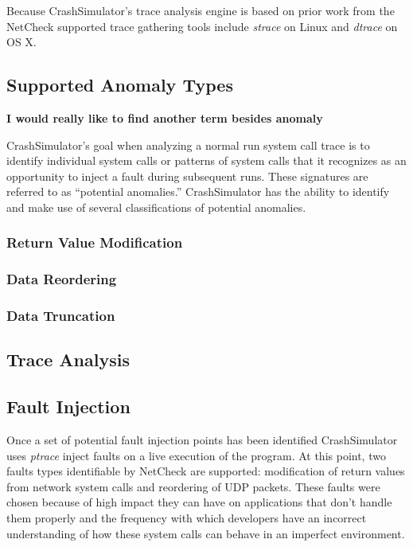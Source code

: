         Because CrashSimulator's trace analysis engine is based on prior work from the NetCheck supported trace
        gathering tools include \emph{strace} on Linux and \emph{dtrace} on OS X.


    \subsection{Supported Anomaly Types}

        \textbf{I would really like to find another term besides anomaly}

        CrashSimulator's goal when analyzing a normal run system call trace is to identify individual system calls or
        patterns of system calls that it recognizes as an opportunity to inject a fault during subsequent runs. These
        signatures are referred to as ``potential anomalies.'' CrashSimulator has the ability to identify and make use
        of several classifications of potential anomalies.

        \subsubsection{Return Value Modification}

        \subsubsection{Data Reordering}

        \subsubsection{Data Truncation}

    \subsection{Trace Analysis}



    \subsection{Fault Injection}



         Once a set of potential fault injection points has been identified CrashSimulator uses \emph{ptrace} inject
         faults on a live execution of the program. At this point, two faults types identifiable by NetCheck are
         supported: modification of return values from network system calls and reordering of UDP packets.  These faults
         were chosen because of high impact they can have on applications that don't handle them properly and the
         frequency with which developers have an incorrect understanding of how these system calls can behave in an
         imperfect environment.

